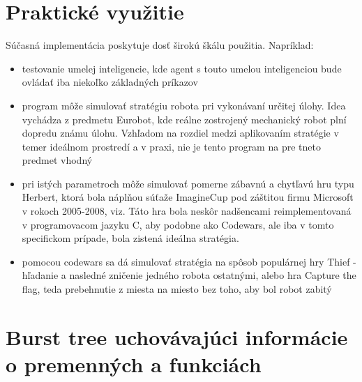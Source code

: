 \documentclass[12pt,a4paper,notitlepage]{report}
\begin{document}
\section{Praktické využitie}
Súčasná implementácia poskytuje dosť širokú škálu použitia. Napríklad:\\
	\begin{itemize}
	\item testovanie umelej inteligencie, kde agent s touto umelou inteligenciou bude ovládať iba niekoľko základných príkazov
	\item program môže simulovať stratégiu robota pri vykonávaní určitej úlohy. Idea vychádza z predmetu Eurobot, kde reálne zostrojený mechanický robot plní dopredu známu úlohu. Vzhľadom na rozdiel medzi aplikovaním stratégie v temer ideálnom prostredí a v praxi, nie je tento program na pre tneto predmet vhodný
	\item pri istých parametroch môže simulovať pomerne zábavnú a chytľavú hru typu Herbert, ktorá bola náplňou súťaže ImagineCup pod záštitou firmu Microsoft v rokoch 2005-2008, viz\cite{imaginecup}. Táto hra bola neskôr nadšencami reimplementovaná v programovacom jazyku C, aby podobne ako Codewars, ale iba v tomto specifickom prípade, bola zistená ideálna stratégia. %
	\item pomocou codewars sa dá simulovať stratégia na spôsob populárnej hry Thief - hľadanie a nasledné zničenie jedného robota ostatnými, alebo hra Capture the flag, teda prebehnutie z miesta na miesto bez toho, aby bol robot zabitý
	\end{itemize}


\section {Burst tree uchovávajúci informácie o premenných a funkciách} 
\end{document}
